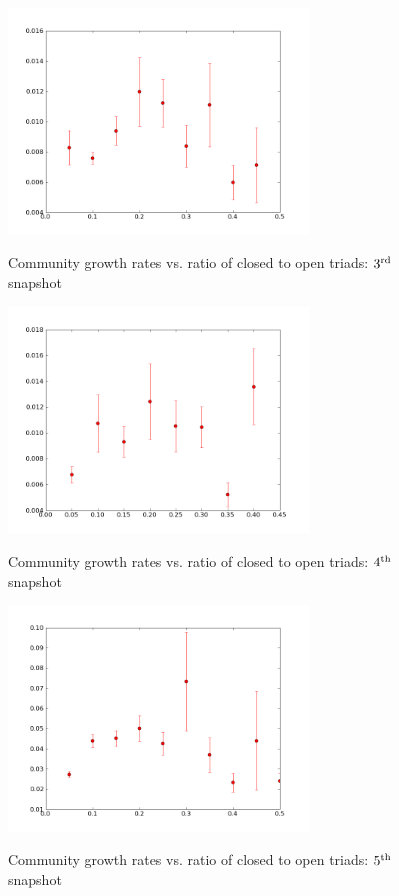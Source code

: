 \begin{figure}
  \begin{center}
    \includegraphics[width=8cm]{../figures/third.png}\label{fig:edge-c}
    \caption{Community growth rates vs. ratio of closed to open triads: $3^{\rm rd}$ snapshot}
    \end{center}
\end{figure}

\begin{figure}
  \begin{center}
    \includegraphics[width=8cm]{../figures/fourth.png}\label{fig:edge-d}
    \caption{Community growth rates vs. ratio of closed to open triads: $4^{\rm th}$ snapshot}
    \end{center}
\end{figure}

\begin{figure}
  \begin{center}
    \includegraphics[width=8cm]{../figures/fifth.png}\label{fig:edge-e}
    \caption{Community growth rates vs. ratio of closed to open triads: $5^{\rm th}$ snapshot}
    \end{center}
\end{figure}


